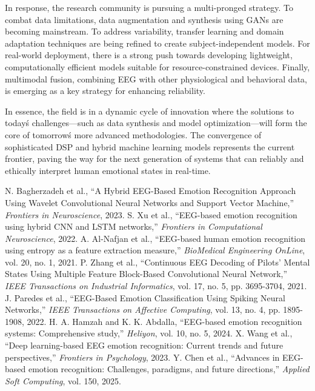 \documentclass[conference]{IEEEtran}
\begin{document}
In response, the research community is pursuing a multi-pronged strategy. To combat data limitations, data augmentation and synthesis using GANs are becoming mainstream. To address variability, transfer learning and domain adaptation techniques are being refined to create subject-independent models. For real-world deployment, there is a strong push towards developing lightweight, computationally efficient models suitable for resource-constrained devices. Finally, multimodal fusion, combining EEG with other physiological and behavioral data, is emerging as a key strategy for enhancing reliability.

In essence, the field is in a dynamic cycle of innovation where the solutions to today\'s challenges—such as data synthesis and model optimization—will form the core of tomorrow\'s more advanced methodologies. The convergence of sophisticated DSP and hybrid machine learning models represents the current frontier, paving the way for the next generation of systems that can reliably and ethically interpret human emotional states in real-time.

\begin{thebibliography}{00}
 N. Bagherzadeh et al., ``A Hybrid EEG-Based Emotion Recognition Approach Using Wavelet Convolutional Neural Networks and Support Vector Machine,'' \textit{Frontiers in Neuroscience}, 2023.
 S. Xu et al., ``EEG-based emotion recognition using hybrid CNN and LSTM networks,'' \textit{Frontiers in Computational Neuroscience}, 2022.
 A. Al-Nafjan et al., ``EEG-based human emotion recognition using entropy as a feature extraction measure,'' \textit{BioMedical Engineering OnLine}, vol. 20, no. 1, 2021.
 P. Zhang et al., ``Continuous EEG Decoding of Pilots’ Mental States Using Multiple Feature Block-Based Convolutional Neural Network,'' \textit{IEEE Transactions on Industrial Informatics}, vol. 17, no. 5, pp. 3695-3704, 2021.
 J. Paredes et al., ``EEG-Based Emotion Classification Using Spiking Neural Networks,'' \textit{IEEE Transactions on Affective Computing}, vol. 13, no. 4, pp. 1895-1908, 2022.
 H. A. Hamzah and K. K. Abdalla, ``EEG-based emotion recognition systems: Comprehensive study,'' \textit{Heliyon}, vol. 10, no. 5, 2024.
 X. Wang et al., ``Deep learning-based EEG emotion recognition: Current trends and future perspectives,'' \textit{Frontiers in Psychology}, 2023.
 Y. Chen et al., ``Advances in EEG-based emotion recognition: Challenges, paradigms, and future directions,'' \textit{Applied Soft Computing}, vol. 150, 2025.
\end{thebibliography}
\end{document}
